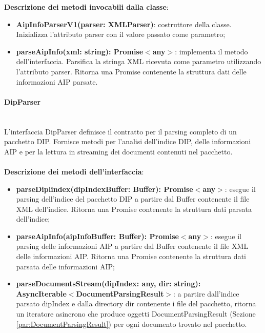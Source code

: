 \documentclass[a4paper,12pt]{article}
\begin{document}
{{{                \noindent \textbf{Descrizione dei metodi invocabili dalla classe}:
                \begin{itemize}
                    \item \textbf{AipInfoParserV1(parser: XMLParser)}: costruttore della classe. Inizializza l'attributo parser con il valore passato come parametro;
                    \item \textbf{parseAipInfo(xml: string): Promise$<$any$>$}: implementa il metodo dell'interfaccia. Parsifica la stringa XML ricevuta come parametro utilizzando l'attributo parser. Ritorna una Promise contenente la struttura dati delle informazioni AIP parsate.
                \end{itemize}
                \paragraph{DipParser}\label{par:DipParser}\mbox{}\\
                L'interfaccia DipParser definisce il contratto per il parsing completo di un pacchetto DIP. Fornisce metodi per l'analisi dell'indice DIP, delle informazioni AIP e per la lettura in streaming dei documenti contenuti nel pacchetto.\\
                \\
                \noindent \textbf{Descrizione dei metodi dell'interfaccia}:
                \begin{itemize}
                    \item \textbf{parseDiplindex(dipIndexBuffer: Buffer): Promise$<$any$>$}: esegue il parsing dell'indice del pacchetto DIP a partire dal Buffer contenente il file XML dell'indice. Ritorna una Promise contenente la struttura dati parsata dell'indice;
                    \item \textbf{parseAipInfo(aipInfoBuffer: Buffer): Promise$<$any$>$}: esegue il parsing delle informazioni AIP a partire dal Buffer contenente il file XML delle informazioni AIP. Ritorna una Promise contenente la struttura dati parsata delle informazioni AIP;
                    \item \textbf{parseDocumentsStream(dipIndex: any, dir: string):\\ AsyncIterable$<$DocumentParsingResult$>$}: a partire dall'indice parsato dipIndex e dalla directory dir contenente i file del pacchetto, ritorna un iteratore asincrono che produce oggetti DocumentParsingResult (Sezione \ref{par:DocumentParsingResult}) per ogni documento trovato nel pacchetto.
                \end{itemize}
}}}
\end{document}
